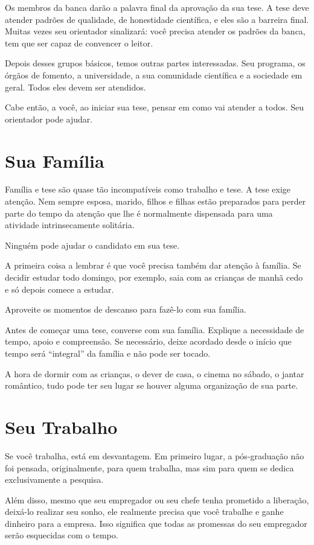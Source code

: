 Os membros da banca darão a palavra final da aprovação da sua tese. A tese deve atender padrões de qualidade, de honestidade científica, e eles são a barreira final. Muitas vezes seu orientador sinalizará: você precisa atender os padrões da banca, tem que ser capaz de convencer o leitor.

Depois desses grupos básicos, temos outras partes interessadas. Seu programa, os órgãos de fomento, a universidade, a sua comunidade científica e a sociedade em geral. Todos eles devem ser atendidos. 

Cabe então, a você, ao iniciar sua tese, pensar em como vai atender a todos. Seu orientador pode ajudar.

\section{Sua Família}
Família e tese são quase tão incompatíveis como trabalho e tese. A tese exige atenção. Nem sempre esposa, marido, filhos e filhas estão preparados para perder parte do tempo da atenção que lhe é normalmente dispensada para uma atividade intrinsecamente solitária.

Ninguém pode ajudar o candidato em sua tese. 

A primeira coisa a lembrar é que você precisa também dar atenção à família. Se decidir estudar todo domingo, por exemplo, saia com as crianças de manhã cedo e só depois comece a estudar. 

Aproveite os momentos de descanso para fazê-lo com sua família. 

Antes de começar uma tese, converse com sua família. Explique a necessidade de tempo, apoio e compreensão. Se necessário, deixe acordado desde o início que tempo será “integral” da família e não pode ser tocado. 

A hora de dormir com as crianças, o dever de casa, o cinema no sábado, o jantar romântico, tudo pode ter seu lugar se houver alguma organização de sua parte. 

\section{Seu Trabalho}

Se você trabalha, está em desvantagem. Em primeiro lugar, a pós-graduação não foi pensada, originalmente, para quem trabalha, mas sim para quem se dedica exclusivamente a pesquisa. 

Além disso, mesmo que seu empregador ou seu chefe tenha prometido a liberação, deixá-lo realizar seu sonho, ele realmente precisa que você trabalhe e ganhe dinheiro para a empresa. Isso significa que todas as promessas do seu empregador serão esquecidas com o tempo.

